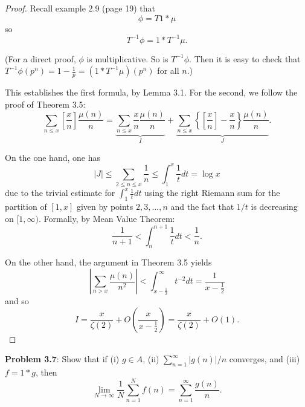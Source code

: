 \documentclass{article}
\newcommand{\IntPart}[1]{\left[ #1 \right]}
\newcommand{\Abs}[1]{\left| #1 \right|}
\newcommand{\O}[1]{O\left( #1 \right)}
\begin{document}
\begin{proof}
Recall example 2.9 (page 19) that
$$\phi = T1 * \mu$$
so
$$T^{-1} \phi = 1 * T^{-1} \mu.$$

(For a direct proof, $\phi$ is multiplicative. So is $T^{-1}\phi$. Then it is easy to check that $T^{-1}\phi(p^n) = 1 - \frac{1}{p} = (1 * T^{-1}\mu)(p^n)$ for all $n$.)

This establishes the first formula, by Lemma 3.1. For the second, we follow the proof of Theorem 3.5:
$$\sum_{n \leq x} \IntPart{\frac{x}{n}} \frac{\mu(n)}{n} = \underbrace{\sum_{n \leq x} \frac{x}{n} \frac{\mu(n)}{n}}_{I} + \underbrace{\sum_{n \leq x} \left\{\IntPart{\frac{x}{n}} - \frac{x}{n} \right\} \frac{\mu(n)}{n}}_{J}.$$

On the one hand, one has
$$|J| \leq \sum_{2 \leq n \leq x} \frac{1}{n} \leq \int_1^x \frac{1}{t} dt = \log x$$
due to the trivial estimate for $\int_1^x \frac{1}{t} dt$ using the right Riemann sum for the partition of $[1, x]$ given by points $2, 3, ..., n$ and the fact that $1/t$ is decreasing on $[1, \infty)$. Formally, by Mean Value Theorem:
$$\frac{1}{n+1} < \int_n^{n+1} \frac{1}{t} dt < \frac{1}{n}.$$

On the other hand, the argument in Theorem 3.5 yields
$$\Abs{\sum_{n > x} \frac{\mu(n)}{n^2}} < \int_{x - \frac12}^{\infty} t^{-2} dt = \frac{1}{x - \frac12}$$
and so
$$I = \frac{x}{\zeta(2)} + O\left(\frac{x}{x - \frac12}\right) = \frac{x}{\zeta(2)} + \O{ 1 }.$$
\end{proof}

\textbf{Problem 3.7}: Show that if (i) $g \in A$, (ii) $\sum_{n=1}^{\infty} |g(n)|/n$ converges, and (iii) $f = 1 * g$, then
$$\lim_{N \rightarrow \infty} \frac{1}{N} \sum_{n=1}^{N} f(n) = \sum_{n=1}^{\infty} \frac{g(n)}{n}.$$
\end{document}

